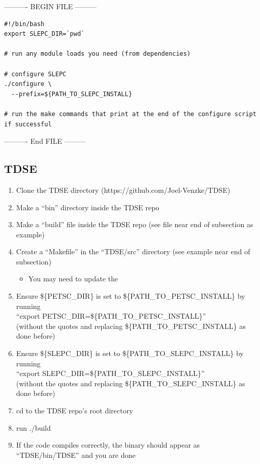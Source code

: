 \documentclass{article}
\begin{document}
---------- BEGIN FILE ---------
\begin{verbatim}
#!/bin/bash
export SLEPC_DIR=`pwd`

# run any module loads you need (from dependencies)

# configure SLEPC
./configure \
  --prefix=${PATH_TO_SLEPC_INSTALL}

# run the make commands that print at the end of the configure script if successful
\end{verbatim}
---------- End FILE ---------

\subsection{TDSE} %
\label{sub:tdse}
\begin{enumerate}
  \item Clone the TDSE directory (https://github.com/Joel-Venzke/TDSE)
  \item Make a ``bin'' directory inside the TDSE repo
  \item Make a ``build'' file inside the TDSE repo (see file near end of subsection as example)
  \item Create a ``Makefile'' in the ``TDSE/src'' directory (see example near end of subsection)
  \begin{itemize}
    \item You may need to update the 
  \end{itemize}
  \item Ensure \$\{PETSC\_DIR\} is set to \$\{PATH\_TO\_PETSC\_INSTALL\} by running \\``export PETSC\_DIR=\$\{PATH\_TO\_PETSC\_INSTALL\}'' \\(without the quotes and replacing \$\{PATH\_TO\_PETSC\_INSTALL\} as done before)
  \item Ensure \$\{SLEPC\_DIR\} is set to \$\{PATH\_TO\_SLEPC\_INSTALL\} by running \\``export SLEPC\_DIR=\$\{PATH\_TO\_SLEPC\_INSTALL\}'' \\(without the quotes and replacing \$\{PATH\_TO\_SLEPC\_INSTALL\} as done before)
  \item cd to the TDSE repo's root directory
  \item run ./build
  \item If the code compiles correctly, the binary should appear as ``TDSE/bin/TDSE'' and you are done
\end{enumerate}
\end{document}
